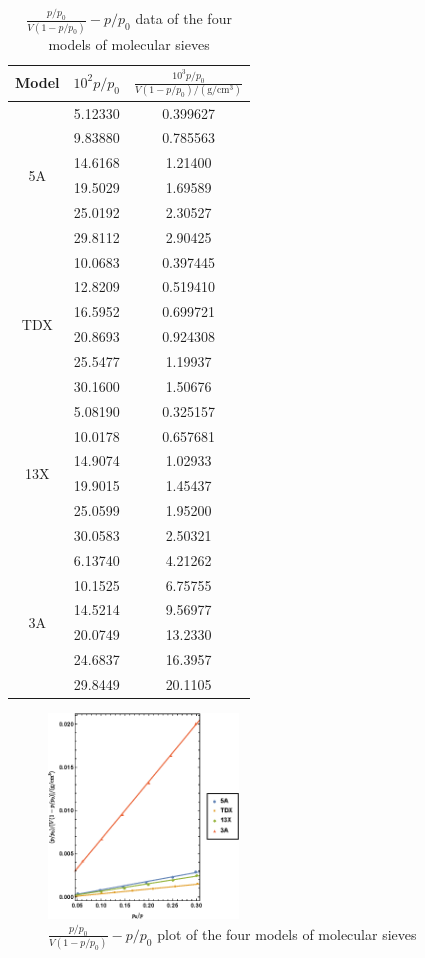 \documentclass[%
 reprint,
 amsmath,amssymb,
 aps,
10.5pt,
]{revtex4-1}
\begin{document}
\begin{table}
\centering
\caption{$\frac{p/p_0}{V(1-p/p_0)} - p/p_0$ data of the four models of molecular sieves}
\begin{tabular}{c|cc}\hline
Model & $10^2 p/p_0 $ & $\frac{10^3 p/p_0}{V(1-p/p_0)/(\mathrm{g/cm^3})} $ \\ \hline
\multirow{6}{*}{5A} & 5.12330 & 0.399627 \\
& 9.83880 & 0.785563 \\
& 14.6168 & 1.21400 \\
& 19.5029 & 1.69589 \\
& 25.0192 & 2.30527 \\
& 29.8112 & 2.90425 \\\hline
\multirow{6}{*}{TDX} & 10.0683 & 0.397445 \\
& 12.8209 & 0.519410 \\
& 16.5952 & 0.699721 \\
& 20.8693 & 0.924308 \\
& 25.5477 & 1.19937 \\
& 30.1600 & 1.50676 \\\hline
\multirow{6}{*}{13X} & 5.08190 & 0.325157 \\
& 10.0178 & 0.657681 \\
& 14.9074 & 1.02933 \\
& 19.9015 & 1.45437 \\
& 25.0599 & 1.95200 \\
& 30.0583 & 2.50321 \\\hline
\multirow{6}{*}{3A} & 6.13740 & 4.21262 \\
& 10.1525 & 6.75755 \\
& 14.5214 & 9.56977 \\
& 20.0749 & 13.2330 \\
& 24.6837 & 16.3957 \\
& 29.8449 & 20.1105 \\\hline
\end{tabular}
\label{BETdata}
\end{table}

\begin{figure}
\centering
\includegraphics[width=0.45\textwidth]{figures/BETEX.eps}
\caption{$\frac{p/p_0}{V(1-p/p_0)} - p/p_0$ plot of the four models of molecular sieves}
\label{fg}
\end{figure}
\end{document}
